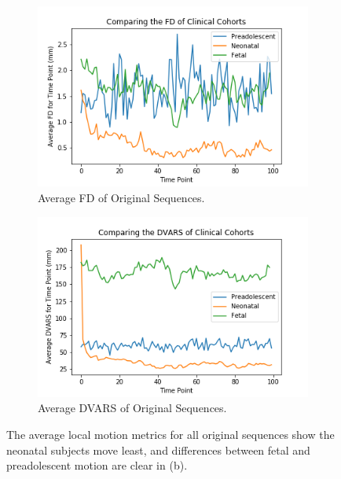 \begin{figure}
	\centering
	\begin{subfigure}{0.6\textwidth}
		\centering
		\includegraphics[width=1.0\textwidth]{7/figures/orig-avg-fd.png}
		\caption{Average FD of Original Sequences.}
	\end{subfigure}
	\hspace{0.05\textwidth}
	\begin{subfigure}{0.6\textwidth}
		\centering
		\includegraphics[width=1.0\textwidth]{7/figures/orig-avg-dvars.png}
		\caption{Average DVARS of Original Sequences.}
	\end{subfigure}
	
\caption{The average local motion metrics for all original sequences show the neonatal subjects move least, and differences between fetal and preadolescent motion are clear in (b).}
\label{fig:orig-local-motion}
\end{figure}

